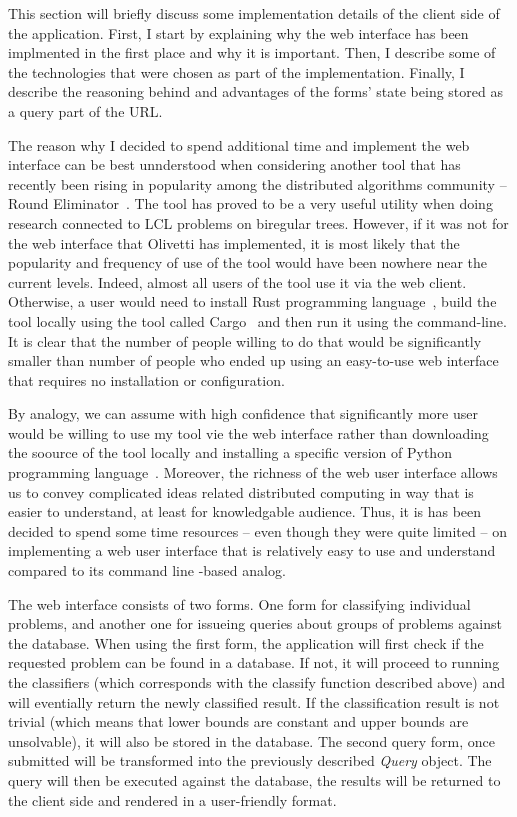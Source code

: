 This section will briefly discuss some implementation details of
the client side of the application. First, I start by explaining why
the web interface has been implmented in the first place and why it
is important. Then, I describe some of the technologies that were
chosen as part of the implementation. Finally, I describe the
reasoning behind and advantages of the forms' state being stored
as a query part of the URL.

The reason why I decided to spend additional time and implement
the web interface can be best unnderstood when considering
another tool that has recently been rising in popularity among
the distributed algorithms community -- Round Eliminator~\cite{Olivetti2020}. The tool has proved to be a very useful utility
when doing research connected to LCL problems on biregular trees.
However, if it was not for the web interface that Olivetti has
implemented, it is most likely that the popularity and
frequency of use of the tool would have been nowhere near the current
levels. Indeed, almost all users of the tool use it via the web
client. Otherwise, a user would need to install Rust programming
language~\cite{Rust}, build the tool locally using the tool
called Cargo~\cite{Cargo} and then run it using the command-line.
It is clear that the number of people willing to do that would be
significantly smaller than number of people who ended up using
an easy-to-use web interface that requires no installation or 
configuration.

By analogy, we can assume with high confidence that significantly more
user would be willing to use my tool vie the web interface rather
than downloading the soource of the tool locally and installing
a specific version of Python programming language~\cite{CPython}.
Moreover, the richness of the web user interface allows us to convey complicated
ideas related distributed computing in way that is easier to understand, at least for knowledgable audience. Thus, it is has been
decided to spend some time resources -- even though they were 
quite limited -- on implementing a web user interface that is
relatively easy to use and understand compared to its
command line -based analog.

The web interface consists of two forms. One form for classifying
individual problems, and another one for issueing queries
about groups of problems against the database. When using the
first form, the application will first check if the requested
problem can be found in a database. If not, it will proceed to
running the classifiers (which corresponds with the classify function described above) and will eventially return the newly
classified result. If the classification result is not trivial (which means that lower bounds are constant and upper bounds are unsolvable),
it will also be stored in the database. The second query form, once
submitted will be transformed into the previously described
\emph{Query} object. The query will then be executed against the database,
the results will be returned to the client side and rendered
in a user-friendly format.

